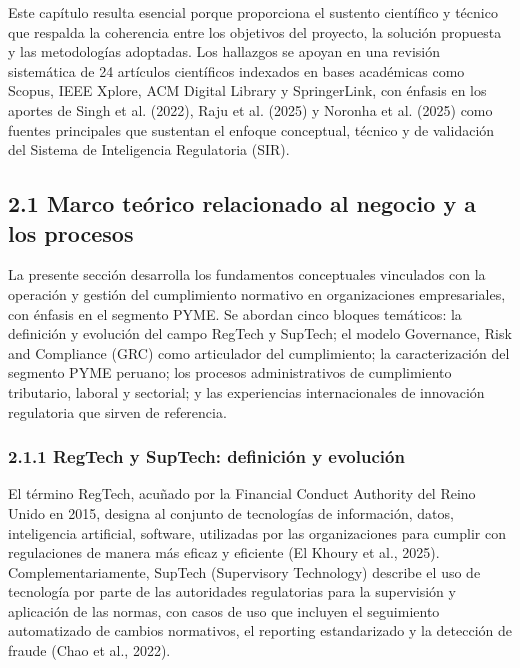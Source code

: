 \documentclass[12pt,a4paper,oneside]{report}
\begin{document}
Este capítulo resulta esencial porque proporciona el sustento científico
y técnico que respalda la coherencia entre los objetivos del proyecto,
la solución propuesta y las metodologías adoptadas. Los hallazgos se
apoyan en una revisión sistemática de 24 artículos científicos indexados
en bases académicas como Scopus, IEEE Xplore, ACM Digital Library y
SpringerLink, con énfasis en los aportes de Singh et al. (2022), Raju et
al. (2025) y Noronha et al. (2025) como fuentes principales que
sustentan el enfoque conceptual, técnico y de validación del Sistema de
Inteligencia Regulatoria (SIR).

\subsection{2.1 Marco teórico relacionado al negocio y a los
procesos}\label{marco-teuxf3rico-relacionado-al-negocio-y-a-los-procesos}

La presente sección desarrolla los fundamentos conceptuales vinculados
con la operación y gestión del cumplimiento normativo en organizaciones
empresariales, con énfasis en el segmento PYME. Se abordan cinco bloques
temáticos: la definición y evolución del campo RegTech y SupTech; el
modelo Governance, Risk and Compliance (GRC) como articulador del
cumplimiento; la caracterización del segmento PYME peruano; los procesos
administrativos de cumplimiento tributario, laboral y sectorial; y las
experiencias internacionales de innovación regulatoria que sirven de
referencia.

\subsubsection{2.1.1 RegTech y SupTech: definición y
evolución}\label{regtech-y-suptech-definiciuxf3n-y-evoluciuxf3n}

El término RegTech, acuñado por la Financial Conduct Authority del Reino
Unido en 2015, designa al conjunto de tecnologías de información, datos,
inteligencia artificial, software, utilizadas por las organizaciones
para cumplir con regulaciones de manera más eficaz y eficiente (El
Khoury et al., 2025). Complementariamente, SupTech (Supervisory
Technology) describe el uso de tecnología por parte de las autoridades
regulatorias para la supervisión y aplicación de las normas, con casos
de uso que incluyen el seguimiento automatizado de cambios normativos,
el reporting estandarizado y la detección de fraude (Chao et al., 2022).
\end{document}
